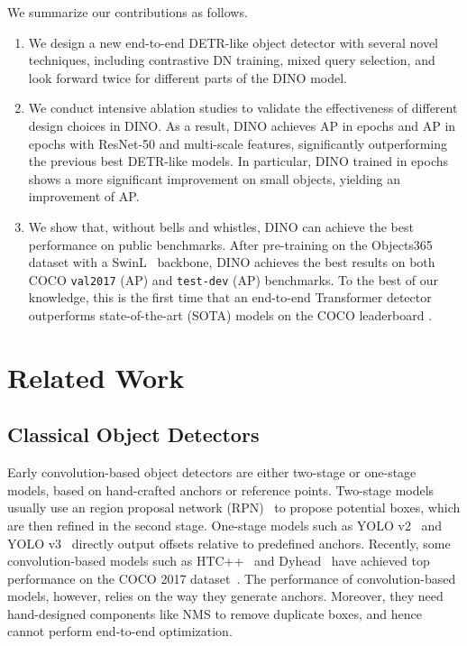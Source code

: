 \documentclass[runningheads]{llncs}
\begin{document}
We summarize our contributions as follows.
\vspace{-0.1cm}
\begin{enumerate}
    \item We design a new end-to-end DETR-like object detector with several novel techniques, including 
contrastive DN training, mixed query selection, and look forward twice for different parts of the DINO model. 
\item We conduct intensive ablation studies to validate the effectiveness of different design choices in DINO. As a result, DINO achieves AP in  epochs and AP in  epochs with ResNet-50 and multi-scale features, significantly outperforming the previous best DETR-like models. In particular, DINO trained in  epochs shows a more significant improvement on small objects, yielding an improvement of AP.
    \item We show that, without bells and whistles, DINO can achieve the best performance on public benchmarks. After pre-training on the Objects365~\cite{shao2019objects365} dataset with a SwinL~\cite{liu2021swin} backbone, DINO achieves the best results on both COCO \texttt{val2017} (AP) and \texttt{test-dev} (AP) benchmarks. To the best of our knowledge, this is the first time that an end-to-end Transformer detector outperforms state-of-the-art (SOTA) models on the COCO leaderboard \cite{paperwithcode}.
\end{enumerate}



\section{Related Work}
\subsection{Classical Object Detectors}
Early convolution-based object detectors are either two-stage or one-stage models, based on hand-crafted anchors or reference points. Two-stage models~\cite{ren2015faster,he2017mask} usually use an region proposal network (RPN)~\cite{ren2015faster} to propose potential boxes, which are then refined in the second stage. One-stage models such as YOLO v2~\cite{redmon2017yolo9000} and YOLO v3~\cite{redmon2018yolov3} directly output offsets relative to predefined anchors. Recently, some convolution-based models such as HTC++~\cite{chen2019hybrid} and Dyhead~\cite{dai2021dynamic} have achieved top performance on the COCO 2017 dataset~\cite{lin2015microsoft}. 
The performance of convolution-based models, however, relies on the way they generate anchors. Moreover, they need hand-designed components like NMS to remove duplicate boxes, and hence cannot perform end-to-end optimization.
\end{document}
